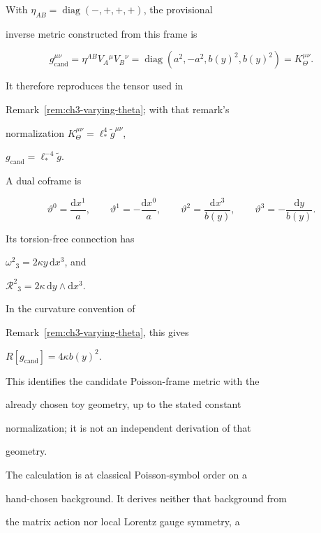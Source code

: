 With \(\eta_{AB}=\operatorname{diag}(-,+,+,+)\), the provisional

inverse metric constructed from this frame is

\[

  g_{\mathrm{cand}}^{\mu\nu}

  =\eta^{AB}V_A{}^\mu V_B{}^\nu

  =\operatorname{diag}(a^2,-a^2,b(y)^2,b(y)^2)

  =K_\Theta^{\mu\nu}.

\]

It therefore reproduces the tensor used in

Remark~\ref{rem:ch3-varying-theta}; with that remark's

normalization \(K_\Theta^{\mu\nu}=\ell_*^4\tilde g^{\mu\nu}\),

\(g_{\mathrm{cand}}=\ell_*^{-4}\tilde g\).



A dual coframe is

\[

  \vartheta^0=\frac{\mathrm{d}x^1}{a},\qquad

  \vartheta^1=-\frac{\mathrm{d}x^0}{a},\qquad

  \vartheta^2=\frac{\mathrm{d}x^3}{b(y)},\qquad

  \vartheta^3=-\frac{\mathrm{d}y}{b(y)}.

\]

Its torsion-free connection has

\(\omega^2{}_3=2\kappa y\,\mathrm{d}x^3\), and

\(\mathcal R^2{}_3=2\kappa\,\mathrm{d}y\wedge\mathrm{d}x^3\).

In the curvature convention of

Remark~\ref{rem:ch3-varying-theta}, this gives

\(R[g_{\mathrm{cand}}]=4\kappa b(y)^2\).

This identifies the candidate Poisson-frame metric with the

already chosen toy geometry, up to the stated constant

normalization; it is not an independent derivation of that

geometry.



The calculation is at classical Poisson-symbol order on a

hand-chosen background. It derives neither that background from

the matrix action nor local Lorentz gauge symmetry, a

